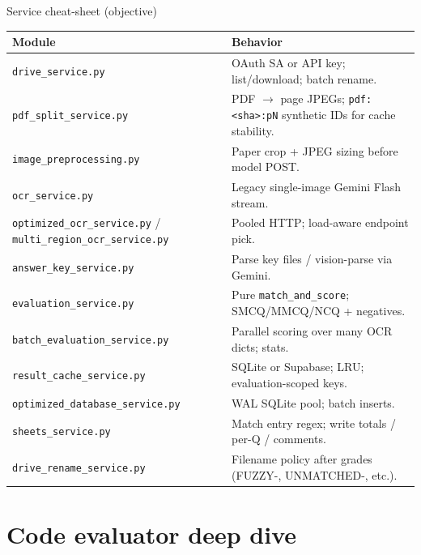 \documentclass[aspectratio=169]{beamer}
\begin{document}
\begin{frame}{Service cheat-sheet (objective)}
  \tiny
  \begin{tabular}{@{}p{3.35cm}p{10.35cm}@{}}
    \toprule
    Module & Behavior \\
    \midrule
    \texttt{drive\_service.py} & OAuth SA or API key; list/download; batch rename. \\
    \texttt{pdf\_split\_service.py} & PDF $\rightarrow$ page JPEGs; \texttt{pdf:<sha>:pN} synthetic IDs for cache stability. \\
    \texttt{image\_preprocessing.py} & Paper crop + JPEG sizing before model POST. \\
    \texttt{ocr\_service.py} & Legacy single-image Gemini Flash stream. \\
    \texttt{optimized\_ocr\_service.py} / \texttt{multi\_region\_ocr\_service.py} & Pooled HTTP; load-aware endpoint pick. \\
    \texttt{answer\_key\_service.py} & Parse key files / vision-parse via Gemini. \\
    \texttt{evaluation\_service.py} & Pure \texttt{match\_and\_score}; SMCQ/MMCQ/NCQ + negatives. \\
    \texttt{batch\_evaluation\_service.py} & Parallel scoring over many OCR dicts; stats. \\
    \texttt{result\_cache\_service.py} & SQLite or Supabase; LRU; evaluation-scoped keys. \\
    \texttt{optimized\_database\_service.py} & WAL SQLite pool; batch inserts. \\
    \texttt{sheets\_service.py} & Match entry regex; write totals / per-Q / comments. \\
    \texttt{drive\_rename\_service.py} & Filename policy after grades (FUZZY-, UNMATCHED-, etc.). \\
    \bottomrule
  \end{tabular}
\end{frame}

\section{Code evaluator deep dive}
\end{document}
